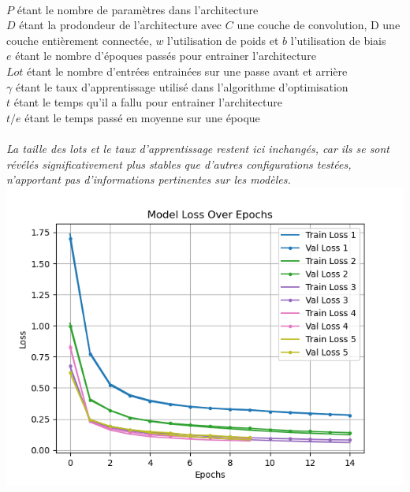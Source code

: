 \begin{multicols}{2}
{\begin{tabular}{l|c c c c c c c|}
    \hline
\end{tabular}}
 \\

{\scriptsize
$P$ étant le nombre de paramètres dans l'architecture\\

$D$ étant la prodondeur de l'architecture avec $C$ une couche de convolution, D une couche entièrement connectée, $w$ l'utilisation de poids et $b$ l'utilisation de biais \\

$e$ étant le nombre d'époques passés pour entrainer l'architecture \\

$Lot$ étant le nombre d'entrées entrainées sur une passe avant et arrière \\

$\gamma$ étant le taux d'apprentissage utilisé dans l'algorithme d'optimisation \\

$t$ étant le temps qu'il a fallu pour entrainer l'architecture \\

$t/e$ étant le temps passé en moyenne sur une époque \\
} \\
\textit{La taille des lots et le taux d’apprentissage restent ici inchangés, car ils se sont révélés significativement plus stables 
que d'autres configurations testées, n'apportant pas d’informations pertinentes sur les modèles.} \\


\includegraphics[width=\columnwidth]{images/mnist_losses.png}
\hfill\break


\end{multicols}

